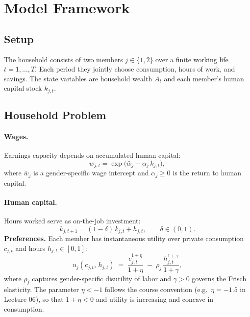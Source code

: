 \vspace{-2.5em}
\section{Model Framework}
\vspace{-1em}
\subsection{Setup}
\vspace{-0.5em}

The household consists of two members $j \in \{1,2\}$ over a finite working life $t = 1, \dots, T$.
Each period they jointly choose consumption, hours of work, and savings.
The state variables are household wealth $A_t$ and each member's human capital stock $k_{j,t}$.
\vspace{-1em}
\subsection{Household Problem}

\vspace{-0.5em}
\paragraph{Wages.} Earnings capacity depends on accumulated human capital:
\vspace{-0.5em}
\begin{equation}
    w_{j,t} = \exp\!\bigl(\bar{w}_j + \alpha_j \, k_{j,t}\bigr),
\end{equation}
\vspace{-0.5em}
where $\bar{w}_j$ is a gender-specific wage intercept and $\alpha_j \geq 0$ is the return to human capital.

\paragraph{Human capital.} Hours worked serve as on-the-job investment:
\vspace{-0.5em}
\begin{equation}
    k_{j,t+1} = (1-\delta)\,k_{j,t} + h_{j,t}, \qquad \delta \in (0,1).
\end{equation}
\vspace{-0.5em}
\noindent \textbf{Preferences.} Each member has instantaneous utility over private consumption $c_{j,t}$ and hours $h_{j,t} \in [0,1]$:
\begin{equation}
    u_j(c_{j,t},\, h_{j,t}) \;=\; \frac{c_{j,t}^{1+\eta}}{1+\eta} \;-\; \rho_j\,\frac{h_{j,t}^{1+\gamma}}{1+\gamma},
\end{equation}
where $\rho_j$ captures gender-specific disutility of labor and $\gamma > 0$ governs the Frisch elasticity. The parameter $\eta < -1$ follows the course convention (e.g.\ $\eta = -1.5$ in Lecture 06), so that $1 + \eta < 0$ and utility is increasing and concave in consumption.
\vspace{-0.5em}
